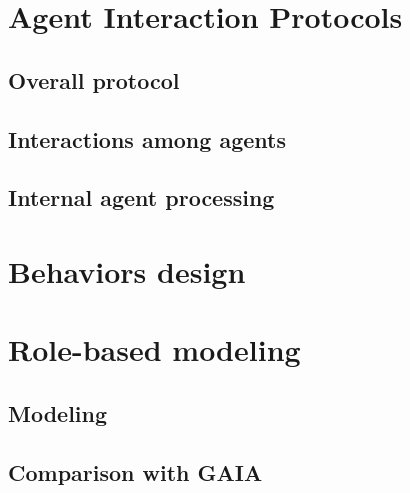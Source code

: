 \documentclass[a4paper,11pt]{report}
\begin{document}
  
  
  
  \section{Agent Interaction Protocols} %
  
  
  \subsection{Overall protocol} %
  
  
  \subsection{Interactions among agents}
  
  
  \subsection{Internal agent processing}


  
  
  \section{Behaviors design} %
  

  
  
  \clearpage %
  
  \section{Role-based modeling} %
  
  \subsection{Modeling}
  
  \subsection{Comparison with GAIA}
\end{document}
